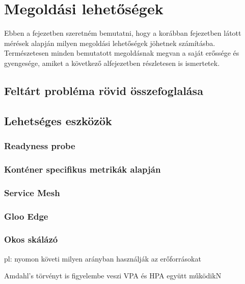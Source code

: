 \chapter{Megoldási lehetőségek}
\label{sec:solutions}

Ebben a fejezetben szeretném bemutatni, hogy a korábban  fejezetben látott mérések alapján milyen megoldási lehetőségek jöhetnek számításba.
Természetesen minden bemutatott megoldásnak megvan a saját erőssége és gyengesége, amiket a következő alfejezetben részletesen is ismertetek.

\section{Feltárt probléma rövid összefoglalása}

\section{Lehetséges eszközök}

\subsection{Readyness probe}

\subsection{Konténer specifikus metrikák alapján}

\subsection{Service Mesh}

\subsection{Gloo Edge}

\subsection{Okos skálázó}

pl: nyomon követi milyen arányban használják az erőforrásokat

Amdahl's törvényt is figyelembe  veszi
VPA és HPA együtt működikN